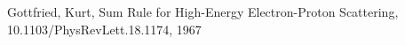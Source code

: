 
  Gottfried, Kurt, Sum Rule for High-Energy Electron-Proton Scattering,
  10.1103/PhysRevLett.18.1174, 1967    

